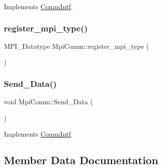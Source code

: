 Implements \mbox{\hyperlink{classCommIntf_a910fdc340f2451051c492a7ee2803b84}{Comm\+Intf}}.

\mbox{\label{classMpiComm_aa74193c044a832b15768b4173141695d}} 
\subsubsection{\texorpdfstring{register\+\_\+mpi\+\_\+type()}{register\_mpi\_type()}}
{\footnotesize\ttfamily M\+P\+I\+\_\+\+Datatype Mpi\+Comm\+::register\+\_\+mpi\+\_\+type (\begin{DoxyParamCaption}\item[{\mbox{\hyperlink{structAER__Msg__t}{A\+E\+R\+\_\+\+Msg\+\_\+t}} const \&}]{ }\end{DoxyParamCaption})\hspace{0.3cm}{\ttfamily [private]}}

\mbox{\label{classMpiComm_aa7615632d7ad06a163ea9d4fc641a85a}} 
\subsubsection{\texorpdfstring{Send\+\_\+\+Data()}{Send\_Data()}}
{\footnotesize\ttfamily void Mpi\+Comm\+::\+Send\+\_\+\+Data (\begin{DoxyParamCaption}\item[{\mbox{\hyperlink{structAER__Msg__t}{A\+E\+R\+\_\+\+Msg\+\_\+t}} const \&}]{ }\end{DoxyParamCaption})\hspace{0.3cm}{\ttfamily [virtual]}}



Implements \mbox{\hyperlink{classCommIntf_a86cc885716df0db3a644b2db2e2a72bb}{Comm\+Intf}}.



\subsection{Member Data Documentation}
\mbox{\label{classMpiComm_acb84b9a6b593438b99c633933547ca09}} 
